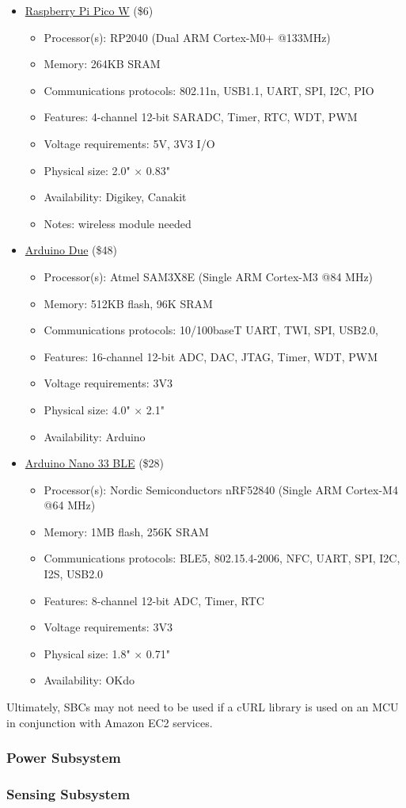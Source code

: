 \begin{itemize}
    \item
    \href{https://www.raspberrypi.com/products/raspberry-pi-pico/}{Raspberry Pi Pico W} (\$6)
    \begin{itemize}
        \item Processor(s): RP2040 (Dual ARM Cortex-M0+ @133MHz)
        \item Memory: 264KB SRAM
        \item Communications protocols: 802.11n, USB1.1, UART, SPI, I2C, PIO
        \item Features: 4-channel 12-bit SARADC, Timer, RTC, WDT, PWM
        \item Voltage requirements: 5V, 3V3 I/O
        \item Physical size: 2.0" $\times$ 0.83"
        \item Availability: Digikey, Canakit
        \item Notes: wireless module needed
    \end{itemize}

    \item
    \href{https://store-usa.arduino.cc/products/arduino-due?selectedStore=us}{Arduino Due} (\$48)
    \begin{itemize}
        \item Processor(s): Atmel SAM3X8E (Single ARM Cortex-M3 @84 MHz)
        \item Memory: 512KB flash, 96K SRAM 
        \item Communications protocols: 10/100baseT UART, TWI, SPI, USB2.0,\
        \item Features: 16-channel 12-bit ADC, DAC, JTAG, Timer, WDT, PWM
        \item Voltage requirements: 3V3
        \item Physical size: 4.0" $\times$ 2.1"
        \item Availability: Arduino
    \end{itemize}

    \item
    \href{https://store-usa.arduino.cc/products/arduino-nano-33-ble?selectedStore=u}{Arduino Nano 33
    BLE} (\$28)
    \begin{itemize}
        \item Processor(s): Nordic Semiconductors nRF52840 (Single ARM Cortex-M4 @64 MHz)
        \item Memory: 1MB flash, 256K SRAM
        \item Communications protocols: BLE5, 802.15.4-2006, NFC, UART, SPI, I2C, I2S, USB2.0
        \item Features: 8-channel 12-bit ADC, Timer, RTC
        \item Voltage requirements: 3V3
        \item Physical size: 1.8" $\times$ 0.71"
        \item Availability: OKdo
    \end{itemize}
\end{itemize}
Ultimately, SBCs may not need to be used if a cURL library is used on an MCU in conjunction with
Amazon EC2 services.


\subsubsection{Power Subsystem}
\subsubsection{Sensing Subsystem}